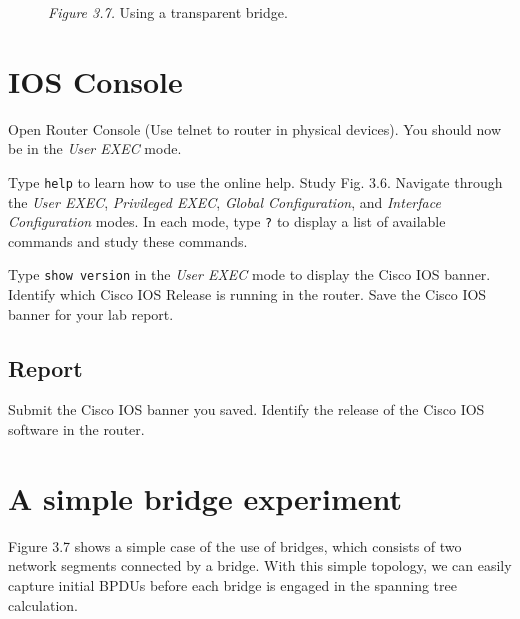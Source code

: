 \documentclass{../UTNetLab}
\begin{document}
    \begin{figure}[H]
        \centering
        \caption{\textit{Figure 3.7.} Using a transparent bridge.}        
    \end{figure}

\section{IOS Console}
    Open Router Console (Use telnet to router in physical devices).
    You should now be in the \textit{User EXEC} mode.

    Type \lstinline[language={cisco}]{help} to learn how to use the online help.
    Study Fig. 3.6. Navigate through the \textit{User EXEC}, \textit{Privileged EXEC}, \textit{Global Configuration}, and \textit{Interface Configuration} modes. In each mode, type \lstinline[language={cisco}]{?} to display a list of available commands and study these commands.

    Type \lstinline[language={cisco}]{show version} in the \textit{User EXEC} mode to display the Cisco IOS banner.
    Identify which Cisco IOS Release is running in the router.
    Save the Cisco IOS banner for your lab report.
    
    \subsection*{Report}
    Submit the Cisco IOS banner you saved.
    Identify the release of the Cisco IOS software in the router.

\section*{A simple bridge experiment}
    Figure 3.7 shows a simple case of the use of bridges, which consists of two network segments connected by a bridge.
    With this simple topology, we can easily capture initial BPDUs before each bridge is engaged in the spanning tree calculation.
\end{document}
